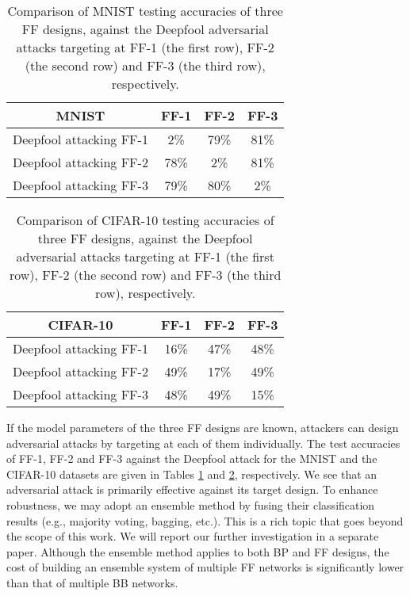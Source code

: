 \documentclass[preprint,12pt]{elsarticle}
\begin{document}
\begin{table}[htb]
\begin{center}
\begin{tabular}{|c|c|c|c|} \hline
MNIST                   & FF-1       & FF-2           & FF-3                  \\ \hline
Deepfool attacking FF-1 & 2\%        &   79\%         &  81\%                 \\ \hline \hline
Deepfool attacking FF-2 & 78\%       &    2\%         &  81\%                 \\ \hline \hline
Deepfool attacking FF-3 & 79\%       &   80\%         &   2\%                 \\ \hline \hline
\end{tabular}
\end{center}
\caption{Comparison of MNIST testing accuracies of three FF designs,
against the Deepfool adversarial attacks targeting at FF-1 (the first
row), FF-2 (the second row) and FF-3 (the third row),
respectively.}\label{table:robustness-3}
\end{table}

\begin{table}[htb]
\begin{center}
\begin{tabular}{|c|c|c|c|} \hline
CIFAR-10                 & FF-1      & FF-2           & FF-3      \\ \hline
Deepfool attacking FF-1 & 16\%       &  47\%          & 48\%      \\ \hline 
Deepfool attacking FF-2 & 49\%       &  17\%          & 49\%      \\ \hline 
Deepfool attacking FF-3 & 48\%       &  49\%          & 15\%      \\ \hline \hline
\end{tabular}
\end{center}
\caption{Comparison of CIFAR-10 testing accuracies of three FF designs,
against the Deepfool adversarial attacks targeting at FF-1 (the first
row), FF-2 (the second row) and FF-3 (the third row), respectively.}
\label{table:robustness-4}
\end{table}

If the model parameters of the three FF designs are known, attackers can
design adversarial attacks by targeting at each of them individually.
The test accuracies of FF-1, FF-2 and FF-3 against the Deepfool attack
for the MNIST and the CIFAR-10 datasets are given in Tables
\ref{table:robustness-3} and \ref{table:robustness-4}, respectively. We
see that an adversarial attack is primarily effective against its target
design. To enhance robustness, we may adopt an ensemble method by fusing
their classification results (e.g., majority voting, bagging, etc.).
This is a rich topic that goes beyond the scope of this work. We will
report our further investigation in a separate paper.  Although the
ensemble method applies to both BP and FF designs, the cost of building
an ensemble system of multiple FF networks is significantly lower than
that of multiple BB networks. 
\end{document}
